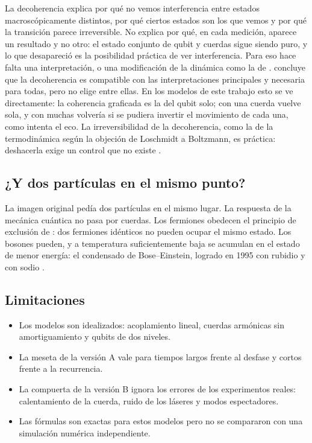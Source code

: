 \documentclass[11pt,a4paper]{article}
\begin{document}
La decoherencia explica por qué no vemos interferencia entre estados macroscópicamente distintos, por qué ciertos estados son los que vemos y por qué la transición parece irreversible. No explica por qué, en cada medición, aparece un resultado y no otro: el estado conjunto de qubit y cuerdas sigue siendo puro, y lo que desapareció es la posibilidad práctica de ver interferencia. Para eso hace falta una interpretación, o una modificación de la dinámica como la de \textcite{ghirardi1986}. \textcite{schlosshauer2005} concluye que la decoherencia es compatible con las interpretaciones principales y necesaria para todas, pero no elige entre ellas. En los modelos de este trabajo esto se ve directamente: la coherencia graficada es la del qubit solo; con una cuerda vuelve sola, y con muchas volvería si se pudiera invertir el movimiento de cada una, como intenta el eco. La irreversibilidad de la decoherencia, como la de la termodinámica según la objeción de Loschmidt a Boltzmann, es práctica: deshacerla exige un control que no existe \parencite{peres1984}.

\subsection{¿Y dos partículas en el mismo punto?}

La imagen original pedía dos partículas en el mismo lugar. La respuesta de la mecánica cuántica no pasa por cuerdas. Los fermiones obedecen el principio de exclusión de \textcite{pauli1925}: dos fermiones idénticos no pueden ocupar el mismo estado. Los bosones pueden, y a temperatura suficientemente baja se acumulan en el estado de menor energía: el condensado de Bose--Einstein, logrado en 1995 con rubidio \parencite{anderson1995} y con sodio \parencite{davis1995}.

\subsection{Limitaciones}

\begin{itemize}
\item Los modelos son idealizados: acoplamiento lineal, cuerdas armónicas sin amortiguamiento y qubits de dos niveles.
\item La meseta de la versión A vale para tiempos largos frente al desfase y cortos frente a la recurrencia.
\item La compuerta de la versión B ignora los errores de los experimentos reales: calentamiento de la cuerda, ruido de los láseres y modos espectadores.
\item Las fórmulas son exactas para estos modelos pero no se compararon con una simulación numérica independiente.
\end{itemize}
\end{document}
